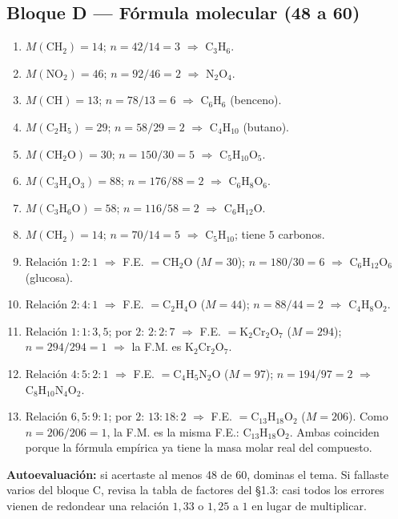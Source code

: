 \documentclass[12pt, letterpaper]{article}
\begin{document}
  \subsection*{Bloque D — Fórmula molecular (48 a 60)}

  \begin{enumerate}[leftmargin=*, label=\textbf{\arabic*.}, start=48]
    \item $M(\text{CH}_2) = 14$; $n = 42/14 = 3$ $\Rightarrow$ $\text{C}_3\text{H}_6$.
    \item $M(\text{NO}_2) = 46$; $n = 92/46 = 2$ $\Rightarrow$ $\text{N}_2\text{O}_4$.
    \item $M(\text{CH}) = 13$; $n = 78/13 = 6$ $\Rightarrow$ $\text{C}_6\text{H}_6$ (benceno).
    \item $M(\text{C}_2\text{H}_5) = 29$; $n = 58/29 = 2$ $\Rightarrow$ $\text{C}_4\text{H}_{10}$ (butano).
    \item $M(\text{CH}_2\text{O}) = 30$; $n = 150/30 = 5$ $\Rightarrow$ $\text{C}_5\text{H}_{10}\text{O}_5$.
    \item $M(\text{C}_3\text{H}_4\text{O}_3) = 88$; $n = 176/88 = 2$ $\Rightarrow$ $\text{C}_6\text{H}_8\text{O}_6$.
    \item $M(\text{C}_3\text{H}_6\text{O}) = 58$; $n = 116/58 = 2$ $\Rightarrow$ $\text{C}_6\text{H}_{12}\text{O}$.
    \item $M(\text{CH}_2) = 14$; $n = 70/14 = 5$ $\Rightarrow$ $\text{C}_5\text{H}_{10}$; tiene $5$ carbonos.
    \item Relación $1 : 2 : 1$ $\Rightarrow$ F.E. $= \text{CH}_2\text{O}$ ($M = 30$); $n = 180/30 = 6$ $\Rightarrow$ $\text{C}_6\text{H}_{12}\text{O}_6$ (glucosa).
    \item Relación $2 : 4 : 1$ $\Rightarrow$ F.E. $= \text{C}_2\text{H}_4\text{O}$ ($M = 44$); $n = 88/44 = 2$ $\Rightarrow$ $\text{C}_4\text{H}_8\text{O}_2$.
    \item Relación $1 : 1 : 3{,}5$; por $2$: $2 : 2 : 7$ $\Rightarrow$ F.E. $= \text{K}_2\text{Cr}_2\text{O}_7$ ($M = 294$); $n = 294/294 = 1$ $\Rightarrow$ la F.M. es $\text{K}_2\text{Cr}_2\text{O}_7$.
    \item Relación $4 : 5 : 2 : 1$ $\Rightarrow$ F.E. $= \text{C}_4\text{H}_5\text{N}_2\text{O}$ ($M = 97$); $n = 194/97 = 2$ $\Rightarrow$ $\text{C}_8\text{H}_{10}\text{N}_4\text{O}_2$.
    \item Relación $6{,}5 : 9 : 1$; por $2$: $13 : 18 : 2$ $\Rightarrow$ F.E. $= \text{C}_{13}\text{H}_{18}\text{O}_2$ ($M = 206$). Como $n = 206/206 = 1$, la F.M. es la misma F.E.: $\text{C}_{13}\text{H}_{18}\text{O}_2$. Ambas coinciden porque la fórmula empírica ya tiene la masa molar real del compuesto.
  \end{enumerate}

  \vspace{8pt}
  \begin{cuadroinfo}
    \small
    \textbf{Autoevaluación:} si acertaste al menos 48 de 60, dominas el tema. Si fallaste varios del bloque C, revisa la tabla de factores del §1.3: casi todos los errores vienen de redondear una relación $1{,}33$ o $1{,}25$ a $1$ en lugar de multiplicar.
  \end{cuadroinfo}
\fi
\end{document}
